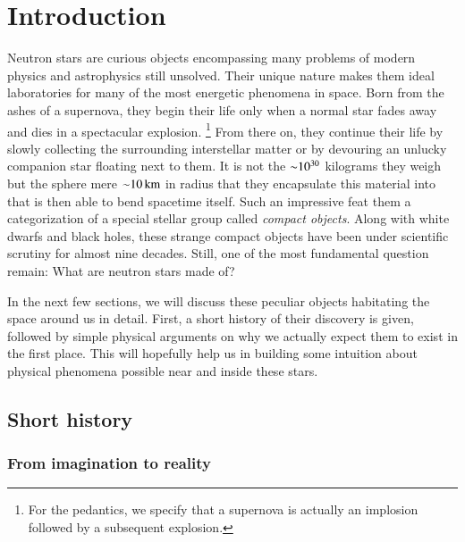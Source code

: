 \chapter{Introduction} 

Neutron stars are curious objects encompassing many problems of modern physics and astrophysics still unsolved.
Their unique nature makes them ideal laboratories for many of the most energetic phenomena in space.
Born from the ashes of a supernova, they begin their life only when a normal star fades away and dies in a spectacular explosion.%
\footnote{ For the pedantics, we specify that a supernova is actually an implosion followed by a subsequent explosion.}
From there on, they continue their life by slowly collecting the surrounding interstellar matter or by devouring an unlucky companion star floating next to them.
It is not the $\mathord{\sim} 10^{30}$ kilograms they weigh but the sphere mere $\mathord{\sim} 10 \, \mathrm{km}$ in radius that they encapsulate this material into that is then able to bend spacetime itself.
Such an impressive feat  them a categorization of a special stellar group called \textit{compact objects}.
Along with white dwarfs and black holes, these strange compact objects have been under scientific scrutiny for almost nine decades.
Still, one of the most fundamental question remain:
What are neutron stars made of?

In the next few sections, we will discuss these peculiar objects habitating the space around us in detail.
First, a short history of their discovery is given, followed by simple physical arguments on why we actually expect them to exist in the first place.
This will hopefully help us in building some intuition about physical phenomena possible near and inside these stars.


\section{Short history}
\subsection{From imagination to reality}

